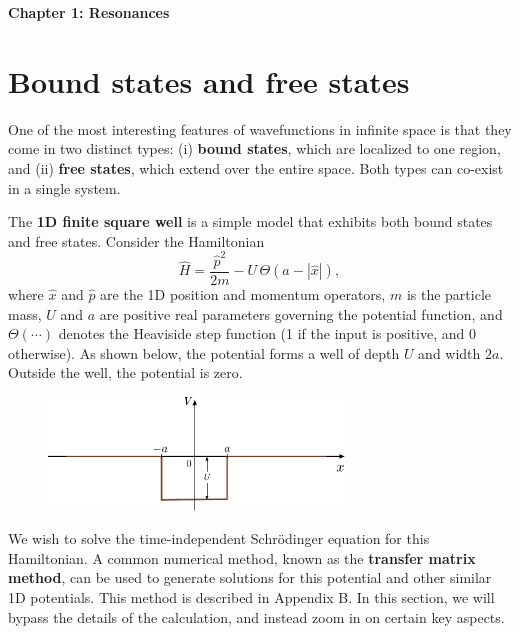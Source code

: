 \documentclass[pra,12pt]{revtex4}
\begin{document}
\begin{center}
{\Large \textbf{Chapter 1: Resonances}}
\end{center}

\section{Bound states and free states}

One of the most interesting features of wavefunctions in infinite
space is that they come in two distinct types: (i) \textbf{bound
  states}, which are localized to one region, and (ii) \textbf{free
  states}, which extend over the entire space.  Both types can
co-exist in a single system.

The \textbf{1D finite square well} is a simple model that exhibits
both bound states and free states.  Consider the Hamiltonian
$$\hat{H} = \frac{\hat{p}^2}{2m} - U \,\Theta(a -|\hat{x}|),$$
where $\hat{x}$ and $\hat{p}$ are the 1D position and momentum
operators, $m$ is the particle mass, $U$ and $a$ are positive real
parameters governing the potential function, and $\Theta(\cdots)$
denotes the Heaviside step function (1 if the input is positive, and 0
otherwise).  As shown below, the potential forms a well of depth $U$
and width $2a$.  Outside the well, the potential is zero.

\begin{figure}[h]
  \centering\includegraphics[width=0.7\textwidth]{squarewell}
\end{figure}

We wish to solve the time-independent Schr\"odinger equation for this
Hamiltonian.  A common numerical method, known as the \textbf{transfer
  matrix method}, can be used to generate solutions for this potential
and other similar 1D potentials.  This method is described in Appendix
B.  In this section, we will bypass the details of the calculation,
and instead zoom in on certain key aspects.
\end{document}
